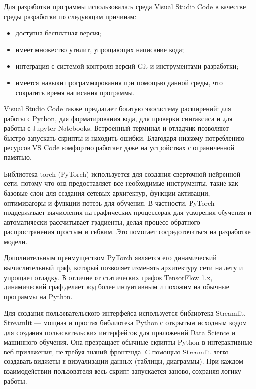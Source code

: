 Для разработки программы использовалась среда Visual Studio Code \cite{vscode} в качестве среды разработки по следующим причинам:

\begin{itemize}[label = ---]
	\item доступна бесплатная версия;
	\item имеет множество утилит, упрощающих написание кода;
	\item интеграция с системой контроля версий Git и инструментами разработки;
	\item имеется навыки программирования при помощью данной среды, что сократить время написания программы.
\end{itemize}

Visual Studio Code также предлагает богатую экосистему расширений: для работы с Python, для форматирования кода, для проверки синтаксиса и для работы с Jupyter Notebooks. Встроенный терминал и отладчик позволяют быстро запускать скрипты и находить ошибки. Благодаря низкому потреблению ресурсов VS Code комфортно работает даже на устройствах с ограниченной памятью.

Библиотека torch (PyTorch)\cite{torch} используется для создания сверточной нейронной сети, потому что она предоставляет все необходимые инструменты, такие как базовые слои для создания сетевых архитектур, функции активации, оптимизаторы и функции потерь для обучения. В частности, PyTorch поддерживает вычисления на графических процессорах для ускорения обучения и автоматически рассчитывает градиенты, делая процесс обратного распространения простым и гибким. Это помогает сосредоточиться на разработке модели.

Дополнительным преимуществом PyTorch является его динамический вычислительный граф, который позволяет изменять архитектуру сети на лету и упрощает отладку. В отличие от статических графов TensorFlow 1.x, динамический граф делает код более интуитивным и похожим на обычные программы на Python. 

Для создания пользовательского интерфейса используется библиотека Streamlit. Streamlit\cite{streamlit} — мощная и простая библиотека Python с открытым исходным кодом для создания пользовательских интерфейсов для приложений Data Science и машинного обучения. Она превращает обычные скрипты Python в интерактивные веб-приложения, не требуя знаний фронтенда. С помощью Streamlit легко создавать виджеты и визуализации данных (таблицы, диаграммы). При каждом взаимодействии пользователя весь скрипт запускается заново, сохраняя логику работы.

